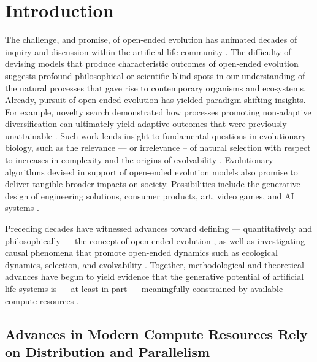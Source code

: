 \section{Introduction}

The challenge, and promise, of open-ended evolution has animated decades of inquiry and discussion within the artificial life community \citep{packard2019overview}.
The difficulty of devising models that produce characteristic outcomes of open-ended evolution suggests profound philosophical or scientific blind spots in our understanding of the natural processes that gave rise to contemporary organisms and ecosystems.
Already, pursuit of open-ended evolution has yielded paradigm-shifting insights.
For example, novelty search demonstrated how processes promoting non-adaptive diversification can ultimately yield adaptive outcomes that were previously unattainable \citep{lehman2011abandoning}.
Such work lends insight to fundamental questions in evolutionary biology, such as the relevance --- or irrelevance -- of natural selection with respect to increases in complexity \citep{lehman2012evolution, lynch2007frailty} and the origins of evolvability \citep{lehman2013evolvability, kirschner1998evolvability}.
Evolutionary algorithms devised in support of open-ended evolution models also promise to deliver tangible broader impacts on society.
Possibilities include the generative design of engineering solutions, consumer products, art, video games, and AI systems \citep{nguyen2015innovation, stanley2017open}.

Preceding decades have witnessed advances toward defining --- quantitatively and philosophically --- the concept of open-ended evolution \citep{lehman2012beyond, dolson2019modes, bedau1998classification}, as well as investigating causal phenomena that promote open-ended dynamics such as ecological dynamics, selection, and evolvability \citep{dolson2019constructive, soros2014identifying, huizinga2018emergence}.
Together, methodological and theoretical advances have begun to yield evidence that the generative potential of artificial life systems is --- at least in part --- meaningfully constrained by available compute resources \citep{channon2019maximum}. %

\subsection{Advances in Modern Compute Resources Rely on Distribution and Parallelism}

